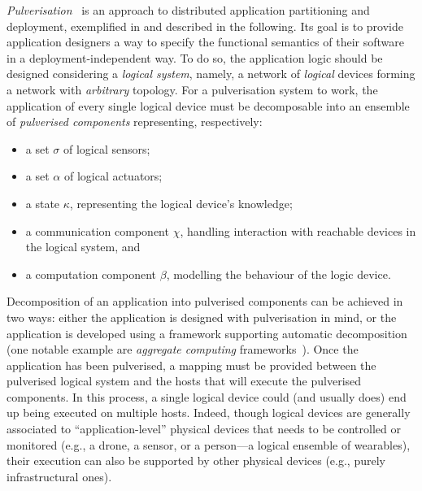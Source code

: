 \documentclass[conference]{IEEEtran}
\begin{document}
\emph{Pulverisation}~\cite{FI2020-pulverization,IEEE-IoTJ-pulverization-simulation}
 is an approach to distributed application partitioning
 and deployment, exemplified in  and described in the following.
%
Its goal 
 is to provide application designers a way to specify the functional semantics of their software in a deployment-independent way.
%
To do so,
the application logic should be designed considering a \emph{logical system},
namely, a network of \emph{logical} devices forming a network with \emph{arbitrary} topology.
%
For a pulverisation system to work,
the application of every single logical device must be decomposable into an ensemble of \emph{pulverised components}
representing, respectively:
\begin{itemize}
    \item a set $\sigma$ of logical sensors;
    \item a set $\alpha$ of logical actuators;
    \item a state $\kappa$, representing the logical device's knowledge;
    \item a communication component $\chi$,
    handling interaction with reachable devices in the logical system, and
    \item a computation component $\beta$, modelling the behaviour of the logic device.
\end{itemize}
%
Decomposition of an application into pulverised components can be achieved in two ways:
either the application is designed with pulverisation in mind,
or the application is developed using a framework supporting automatic decomposition
(one notable example are \emph{aggregate computing} frameworks~\cite{BealIEEEComputer2015,JLAMP2019}).
%
Once the application has been pulverised,
a mapping must be provided between the pulverised logical system and the hosts that will execute the pulverised components.
%
In this process,
a single logical device could (and usually does) end up being executed on multiple hosts.
%
Indeed, though logical devices are generally associated to ``application-level'' physical devices that needs to be controlled or monitored (e.g., a drone, a sensor, or a person---a logical ensemble of wearables),
 their execution can also be supported by other physical devices (e.g., purely infrastructural ones).
\end{document}
